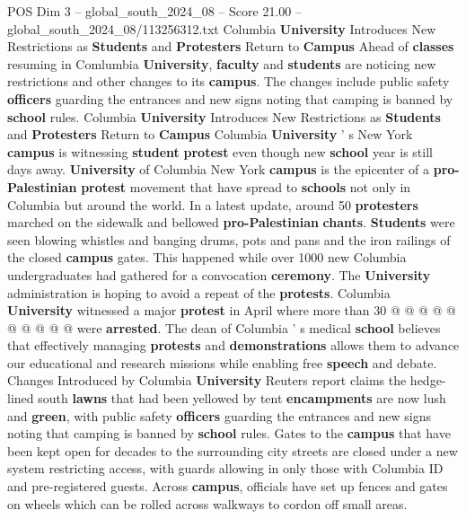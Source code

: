 \begin{textsample}{POS Dim 3 – global\_south\_2024\_08 – Score 21.00 – global\_south\_2024\_08/113256312.txt}  \label{ex:f3_pos_299}
Columbia \textbf{University} Introduces New Restrictions as \textbf{Students} and \textbf{Protesters} Return to \textbf{Campus} Ahead of \textbf{classes} resuming in Comlumbia \textbf{University}, \textbf{faculty} and \textbf{students} are noticing new restrictions and other changes to its \textbf{campus}.
The changes include public safety \textbf{officers} guarding the entrances and new signs noting that camping is banned by \textbf{school} rules.
Columbia \textbf{University} Introduces New Restrictions as \textbf{Students} and \textbf{Protesters} Return to \textbf{Campus} Columbia \textbf{University} ' s New York \textbf{campus} is witnessing \textbf{student} \textbf{protest} even though new \textbf{school} year is still days away. \textbf{University} of Columbia New York \textbf{campus} is the epicenter of a \textbf{pro-Palestinian} \textbf{protest} movement that have spread to \textbf{schools} not only in Columbia but around the world.
In a latest update, around 50 \textbf{protesters} marched on the sidewalk and bellowed \textbf{pro-Palestinian} \textbf{chants}. \textbf{Students} were seen blowing whistles and banging drums, pots and pans and the iron railings of the closed \textbf{campus} gates.
This happened while over 1000 new Columbia undergraduates had gathered for a convocation \textbf{ceremony}.
The \textbf{University} administration is hoping to avoid a repeat of the \textbf{protests}.
Columbia \textbf{University} witnessed a major \textbf{protest} in April where more than 30 @ @ @ @ @ @ @ @ @ @ were \textbf{arrested}.
The dean of Columbia ' s medical \textbf{school} believes that effectively managing \textbf{protests} and \textbf{demonstrations} allows them to advance our educational and research missions while enabling free \textbf{speech} and debate.
Changes Introduced by Columbia \textbf{University} Reuters report claims the hedge-lined south \textbf{lawns} that had been yellowed by tent \textbf{encampments} are now lush and \textbf{green}, with public safety \textbf{officers} guarding the entrances and new signs noting that camping is banned by \textbf{school} rules.
Gates to the \textbf{campus} that have been kept open for decades to the surrounding city streets are closed under a new system restricting access, with guards allowing in only those with Columbia ID and pre-registered guests.
Across \textbf{campus}, officials have set up fences and gates on wheels which can be rolled across walkways to cordon off small areas.

\end{textsample}
